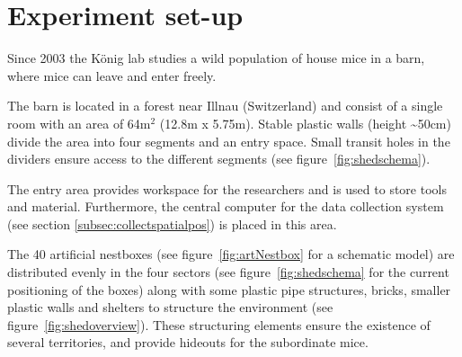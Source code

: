 \newpage
\section{Experiment set-up}
\label{sec:shedsetup}

Since 2003 the K\"onig lab studies a wild population of house mice in a barn, where mice can leave and enter freely.

The barn is located in a forest near Illnau (Switzerland) and consist of a single room with an area of 64m$^2$ (12.8m x 5.75m). Stable plastic walls (height \textasciitilde50cm) divide the area into four segments and an entry space. Small transit holes in the dividers ensure access to the different segments (see figure~\ref{fig:shedschema}).

The entry area provides workspace for the researchers and is used to store tools and material. Furthermore, the central computer for the data collection system (see section \ref{subsec:collectspatialpos}) is placed in this area.

The 40 artificial nestboxes (see figure~\ref{fig:artNestbox} for a schematic model) are distributed evenly in the four sectors (see figure~\ref{fig:shedschema} for the current positioning of the boxes) along with some plastic pipe structures, bricks, smaller plastic walls and shelters to structure the environment (see figure~\ref{fig:shedoverview}). These structuring elements ensure the existence of several territories, and provide hideouts for the subordinate mice.

